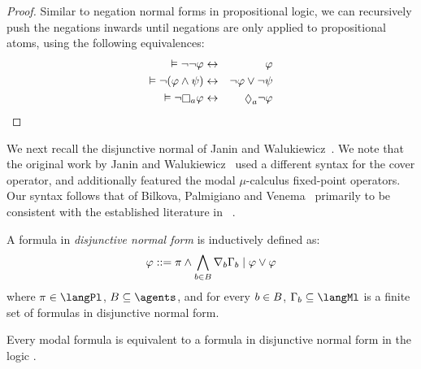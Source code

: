 \begin{proof}
Similar to negation normal forms in propositional logic, we can recursively push the negations inwards until negations are only applied to propositional atoms, using the following equivalences:
\begin{eqnarray*}
    \entails \lnot \lnot \phi &\iff& \phi\\
    \entails \lnot (\phi \land \psi) &\iff& \lnot \phi \lor \lnot \psi\\
    \entails \lnot \necessaryA \phi &\iff& \possibleA \lnot \phi
\end{eqnarray*}
\end{proof}

We next recall the disjunctive normal of Janin and Walukiewicz~\cite{janin:1995}.
We note that the original work by Janin and Walukiewicz~\cite{janin:1995} used a different syntax for the cover operator, and additionally featured the modal $\mu$-calculus fixed-point operators.
Our syntax follows that of Bilkova, Palmigiano and Venema~\cite{bilkova:2008} primarily to be consistent with the established literature in \logicRml{}~\cite{vanditmarsch:2009,vanditmarsch:2010}.

\begin{definition}\label{dnf}
A formula in {\em disjunctive normal form} is inductively defined as:
$$
\varphi ::= \pi \land \bigwedge_{b \in B} \nabla_{b} \Gamma_b \mid \varphi \lor \varphi
$$
where $\pi \in \langPl$, $\agentsB \subseteq \agents$, and for every $b \in B$, $\Gamma_\agentB \subseteq \langMl$ is a finite set of formulas in disjunctive normal form.
\end{definition}

\begin{lemma}\label{dnf-equivalent}
Every modal formula is equivalent to a formula in disjunctive normal form in the logic \logicK{}.
\end{lemma}

